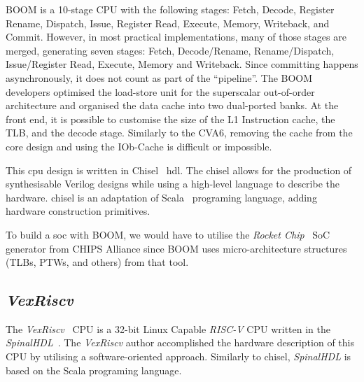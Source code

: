 BOOM is a 10-stage CPU with the following stages: Fetch, Decode, Register Rename, Dispatch, Issue, Register Read, Execute, Memory, Writeback, and Commit. However, in most practical implementations, many of those stages are merged, generating seven stages: Fetch, Decode/Rename, Rename/Dispatch, Issue/Register Read, Execute, Memory and Writeback. Since committing happens asynchronously, it does not count as part of the \enquote{pipeline}. The BOOM developers optimised the load-store unit for the superscalar out-of-order architecture and organised the data cache into two dual-ported banks. At the front end, it is possible to customise the size of the L1 Instruction cache, the TLB, and the decode stage. Similarly to the CVA6, removing the cache from the core design and using the IOb-Cache is difficult or impossible.

This \acrshort{cpu} design is written in Chisel~\cite{bachrach2012chisel} \acrfull{hdl}. The \acrfull{chisel} allows for the production of synthesisable Verilog designs while using a high-level language to describe the hardware. \acrshort{chisel} is an adaptation of Scala~\cite{odersky2004scala} programing language, adding hardware construction primitives.

To build a \acrfull{soc} with BOOM, we would have to utilise the \textit{Rocket Chip}~\cite{asanovic2016rocket} SoC generator from CHIPS Alliance since BOOM uses micro-architecture structures (TLBs, PTWs, and others) from that tool.

\subsection{\textit{VexRiscv}}
The \textit{VexRiscv}~\cite{vexriscv} CPU is a 32-bit Linux Capable \textit{RISC-V} CPU written in the \textit{SpinalHDL}~\cite{papon2017spinalhdl}. The \textit{VexRiscv} author accomplished the hardware description of this CPU by utilising a software-oriented approach. Similarly to \acrshort{chisel}, \textit{SpinalHDL} is based on the Scala programing language.

